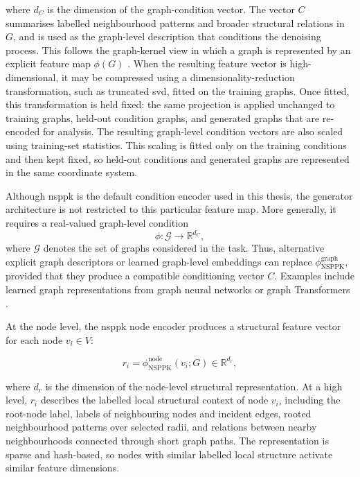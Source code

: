 where \(d_C\) is the dimension of the graph-condition vector. The vector \(C\)
summarises labelled neighbourhood patterns and broader structural relations in
\(G\), and is used as the graph-level description that conditions the denoising
process. This follows the graph-kernel view in which a graph is represented by
an explicit feature map \(\phi(G)\)
\citep{costa2010fast,borgwardt2005shortest,neumann2016propagation}. When the
resulting feature vector is high-dimensional, it may be compressed using a
dimensionality-reduction transformation, such as truncated \gls{svd}, fitted on
the training graphs. Once fitted, this transformation is held fixed: the same
projection is applied unchanged to training graphs, held-out condition graphs,
and generated graphs that are re-encoded for analysis.
The resulting graph-level condition vectors are also scaled using training-set
statistics. This scaling is fitted only on the training conditions and then
kept fixed, so held-out conditions and generated graphs are represented in the
same coordinate system.

Although \gls{nsppk} is the default condition encoder used in this thesis, the
generator architecture is not restricted to this particular feature map. More
generally, it requires a real-valued graph-level condition
\[
    \phi:\mathcal{G}\to\mathbb{R}^{d_C},
\]
where \(\mathcal{G}\) denotes the set of graphs considered in the task. Thus,
alternative explicit graph descriptors or learned graph-level embeddings can
replace \(\phi_{\mathrm{NSPPK}}^{\mathrm{graph}}\), provided that they produce a
compatible conditioning vector \(C\). Examples include learned graph
representations from graph neural networks or graph Transformers
\citep{hamilton2017graphsage,zhang2018endtoend,dwivedi2021graph}.

At the node level, the \gls{nsppk} node encoder produces a structural feature
vector for each node \(v_i\in V\):

\[
    r_i
    =
    \phi_{\mathrm{NSPPK}}^{\mathrm{node}}(v_i;G)
    \in
    \mathbb{R}^{d_r},
\]

where \(d_r\) is the dimension of the node-level structural representation. At
a high level, \(r_i\) describes the labelled local structural context of node
\(v_i\), including the root-node label, labels of neighbouring nodes and
incident edges, rooted neighbourhood patterns over selected radii, and
relations between nearby neighbourhoods connected through short graph paths.
The representation is sparse and hash-based, so nodes with similar labelled
local structure activate similar feature dimensions.

